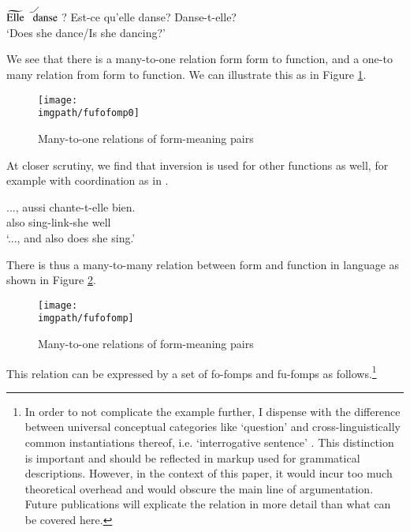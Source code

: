 \ea\label{ex:frenchquestions}
\ea $\widetilde{\rm Elle}$ $\stackrel{\_\diagup\hspace{.7cm}}{\rm danse}$?
\ex Est-ce qu'elle danse?
\ex Danse-t-elle?\\
 `Does she dance/Is she dancing?'
\z
\z

We see that there is a many-to-one relation form form to function, and a one-to many relation from form to function. We can illustrate this as in Figure \ref{fig:fufofomp:intro}.

\begin{figure}[h]
\texttt{[image: \\imgpath/fufofomp0]}
\caption{Many-to-one relations of form-meaning pairs}
\label{fig:fufofomp:intro} 
\end{figure}

At closer scrutiny, we find that inversion is used for other functions as well, for example with coordination as in .

\ea\label{ex:french:coordination}
\gll ..., aussi chante-t-elle bien.\\
     {} also sing-link-she well\\
     `..., and also does she sing.'
\z

There is thus a many-to-many relation between form and function in language \citep{Noonan2006} as shown in Figure \ref{fig:fufofomp:outro}.
 

\begin{figure}[h]
\texttt{[image: \\imgpath/fufofomp]}
\caption{Many-to-one relations of form-meaning pairs}
\label{fig:fufofomp:outro} 
\end{figure}

This relation can be expressed by a set of fo-fomps and fu-fomps as follows.\footnote{In 
 order to not complicate the example further, I dispense with the difference between universal conceptual categories like `question' and cross-linguistically common instantiations thereof, i.e. `interrogative sentence' \citep[but see][]{Lehmann1993}. This distinction is important and should be reflected in markup used for grammatical descriptions. However, in the context of this paper, it would incur too much theoretical overhead and would obscure the main line of argumentation. Future publications will explicate the relation in more detail than what can be covered here.
}


